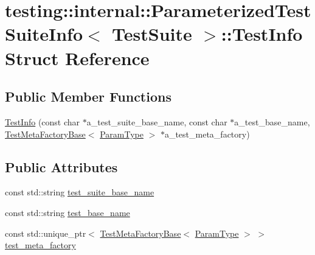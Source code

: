 \hypertarget{structtesting_1_1internal_1_1ParameterizedTestSuiteInfo_1_1TestInfo}{}\section{testing\+:\+:internal\+:\+:Parameterized\+Test\+Suite\+Info$<$ Test\+Suite $>$\+:\+:Test\+Info Struct Reference}
\label{structtesting_1_1internal_1_1ParameterizedTestSuiteInfo_1_1TestInfo}
\subsection*{Public Member Functions}
\begin{DoxyCompactItemize}
\item 
\hyperlink{structtesting_1_1internal_1_1ParameterizedTestSuiteInfo_1_1TestInfo_ad48e887f53f0fcee13f2213b202ac989}{Test\+Info} (const char $\ast$a\+\_\+test\+\_\+suite\+\_\+base\+\_\+name, const char $\ast$a\+\_\+test\+\_\+base\+\_\+name, \hyperlink{classtesting_1_1internal_1_1TestMetaFactoryBase}{Test\+Meta\+Factory\+Base}$<$ \hyperlink{classtesting_1_1internal_1_1ParameterizedTestSuiteInfo_a10761bd750a6820a8d8d2c654b10fe54}{Param\+Type} $>$ $\ast$a\+\_\+test\+\_\+meta\+\_\+factory)
\end{DoxyCompactItemize}
\subsection*{Public Attributes}
\begin{DoxyCompactItemize}
\item 
const std\+::string \hyperlink{structtesting_1_1internal_1_1ParameterizedTestSuiteInfo_1_1TestInfo_aa66b8784771455cb1ec38636a9c4fbb7}{test\+\_\+suite\+\_\+base\+\_\+name}
\item 
const std\+::string \hyperlink{structtesting_1_1internal_1_1ParameterizedTestSuiteInfo_1_1TestInfo_a1c3faeadf1be6b9fd32f0321d9bfafce}{test\+\_\+base\+\_\+name}
\item 
const std\+::unique\+\_\+ptr$<$ \hyperlink{classtesting_1_1internal_1_1TestMetaFactoryBase}{Test\+Meta\+Factory\+Base}$<$ \hyperlink{classtesting_1_1internal_1_1ParameterizedTestSuiteInfo_a10761bd750a6820a8d8d2c654b10fe54}{Param\+Type} $>$ $>$ \hyperlink{structtesting_1_1internal_1_1ParameterizedTestSuiteInfo_1_1TestInfo_a317db7c71ce8ee73df2489a6b895f98a}{test\+\_\+meta\+\_\+factory}
\end{DoxyCompactItemize}


